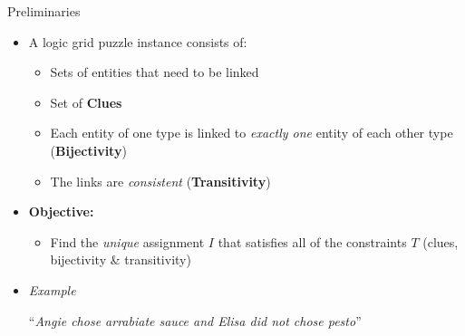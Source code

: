 \documentclass{beamer}
\begin{document}
\begin{frame}{Preliminaries}
    \begin{itemize}
        \item A logic grid puzzle instance consists of:
              \begin{itemize}
                  \item Sets of entities that need to be linked
                  \item Set of \textbf{Clues}
                  \item Each entity of one type is linked to \textit{exactly one} entity of each other type (\textbf{Bijectivity})
                  \item The links are \textit{consistent} (\textbf{Transitivity})
              \end{itemize}\pause
        \item  \textbf{Objective:}
              \begin{itemize}\small
                  \item Find the \textit{unique} assignment $I$ that satisfies all of the constraints $T$ (clues, bijectivity \& transitivity)
              \end{itemize}\pause
        \item \textit{Example}
              \begin{center}
                  \small``\textit{Angie chose arrabiate sauce and Elisa did not chose pesto}'' \\
              \end{center}
    \end{itemize}\pause

\end{frame}
\end{document}

